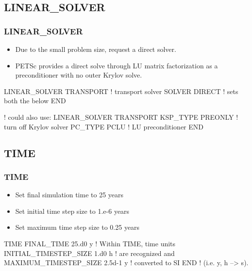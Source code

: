 \documentclass{beamer}
\newcommand\redcomment[1]{{{\color{red} #1}}}
\newcommand\bluecomment[1]{{{\color{blue} #1}}}
\newcommand\greencomment[1]{{{\color{green} #1}}}
\begin{document}
\subsection{LINEAR\_SOLVER}

\begin{frame}[fragile]\frametitle{LINEAR\_SOLVER}

\begin{itemize}
\item Due to the small problem size, request a direct solver.
\item PETSc provides a direct solve through LU matrix factorization as a preconditioner with no outer Krylov solve.
\end{itemize}

\begin{semiverbatim}

LINEAR_SOLVER TRANSPORT   \bluecomment{! transport solver}
  SOLVER DIRECT           \bluecomment{! sets both the below}
END

\bluecomment{! could also use:}
LINEAR_SOLVER TRANSPORT    
  KSP_TYPE PREONLY        \bluecomment{! turn off Krylov solver}
  PC_TYPE PCLU            \bluecomment{! LU preconditioner}
END

\end{semiverbatim}

\end{frame}

\subsection{TIME}

\begin{frame}[fragile]\frametitle{TIME}

\begin{itemize}
\item Set final simulation time to 25 years
\item Set initial time step size to 1.e-6 years
\item Set maximum time step size to 0.25 years
\end{itemize}


\begin{semiverbatim}

TIME
  FINAL_TIME 25.d0 \redcomment{y}            \bluecomment{! Within TIME, time units}
  INITIAL_TIMESTEP_SIZE 1.d0 \redcomment{h}    \bluecomment{! are recognized and}
  MAXIMUM_TIMESTEP_SIZE 2.5d-1 \redcomment{y}  \bluecomment{! converted to SI}
END                               \bluecomment{! (i.e. \redcomment{y}, \redcomment{h} --> \greencomment{s}).}
\end{semiverbatim}

\end{frame}
\end{document}
